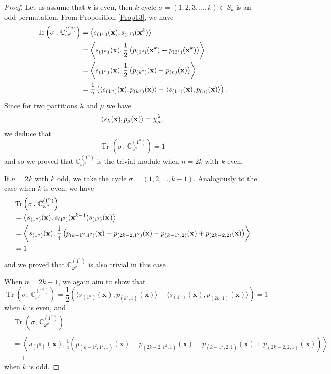 \documentclass[11pt]{article}
\theoremstyle{definition}
\numberwithin{equation}{section}
\newcommand{\x}{{\bf x}}
\DeclareMathOperator{\Tr}{Tr} \DeclareMathOperator{\Ind}{Ind}
\begin{document}
\begin{proof}
	Let us assume that $k$ is even, then $k$-cycle  $\sigma=(1,2,3,\dots,k)\in S_k$ is an odd permutation.
	From Proposition \ref{Prop13}, we have
	\begin{align*}
		\Tr\left(\sigma\,,\, \mathbb{C}_{\omega^o}^{(1^n)}\right)&=\left\langle s_{(1^n)}({\bf x}),s_{(1^2)}({\bf x}^k)\right\rangle\\
		&=\left\langle s_{(1^n)}({\bf x}),\frac{1}{2}\left(p_{(1^2)}({\bf x}^k)-p_{(2^1)}({\bf x}^k)\right)\right\rangle\\
		&=\left\langle s_{(1^n)}({\bf x}),\frac{1}{2}\left(p_{(k^2)}({\bf x})-p_{(n)}({\bf x})\right)\right\rangle\\
		&=\frac{1}{2}\left(\langle s_{(1^n)}(\x),p_{(k^2)}(\x)\rangle-\langle s_{(1^n)}(\x),p_{(n)}(\x)\rangle\right).
	\end{align*}
	Since for two partitions $\lambda$ and $\mu$ we have
	$$
	\langle s_\lambda(\x),p_\mu(\x)\rangle=\chi^\lambda_\mu,
	$$
	we deduce that 
	$$
	\Tr\left(\sigma\,,\, \mathbb{C}_{\omega^o}^{(1^n)}\right)=1
	$$
	and so we proved that $\mathbb{C}^{(1^n)}_{\omega^o}$ is the trivial module when $n=2k$ with $k$ even.
	
	If $n=2k$ with $k$ odd, we take the cycle $\sigma=(1,2,\dots,k-1)$. Analogously to the case when $k$ is even, we have 
	\begin{align*}
		&\Tr\left(\sigma\,,\, \mathbb{C}_{\omega^o}^{(1^n)}\right) \\
		&=\left\langle s_{(1^n)}({\bf x}),s_{(1^2)}({\bf x}^{k-1})s_{(1^2)}({\bf x})\right\rangle
		\\
		&=  \left\langle s_{(1^n)}(\x),\frac{1}{4}\left( p_{(k-1^2,1^2)}(\x) - p_{(2k-2,1^2)}(\x) -p_{(k-1^2,2)}(\x) +  p_{(2k-2, 2)}(\x)\right)\right\rangle  \\
		&=1
	\end{align*}
	and we proved that $\mathbb{C}^{(1^n)}_{\omega^o}$ is also trivial in this case.
	
	
	
	When \(n = 2k + 1\), we again aim to show that
	\[
	\Tr\left(\sigma,\, \mathbb{C}_{\omega^o}^{(1^n)}\right) = \frac{1}{2} \left( \langle s_{(1^n)}(\mathbf{x}), p_{(k^2,1)}(\mathbf{x}) \rangle - \langle s_{(1^n)}(\mathbf{x}), p_{(2k,1)}(\mathbf{x}) \rangle \right) = 1
	\]
	when \(k\) is even, and
	\[\begin{split}
	& \Tr\left(\sigma,\, \mathbb{C}_{\omega^o}^{(1^n)}\right)\\
	\\ & = \left\langle s_{(1^n)}(\mathbf{x}), \frac{1}{4} \left( p_{(k-1^2,1^2,1)}(\mathbf{x}) - p_{(2k-2,1^2,1)}(\mathbf{x}) - p_{(k-1^2,2,1)}(\mathbf{x}) + p_{(2k-2,2,1)}(\mathbf{x}) \right) \right\rangle \\ &= 1\end{split}\]
	when \(k\) is odd.
	

\end{proof}
\end{document}
